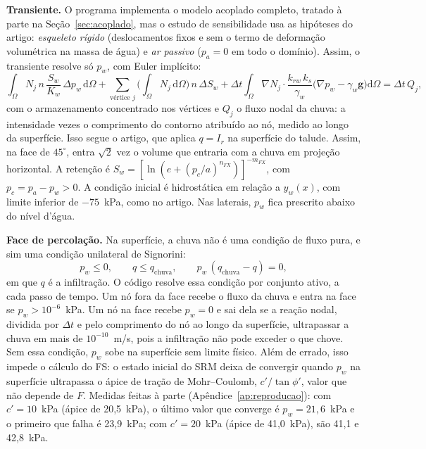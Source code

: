 \documentclass[11pt,a4paper]{article}
\numberwithin{equation}{section}
\begin{document}
\textbf{Transiente.} O programa implementa o modelo acoplado completo, tratado à parte na Seção~\ref{sec:acoplado}, mas o estudo de sensibilidade usa as hipóteses do artigo: \emph{esqueleto
rígido} (deslocamentos fixos e sem o termo de deformação volumétrica na massa de água) e \emph{ar passivo} ($p_a = 0$ em todo o
domínio). Assim, o transiente resolve só $p_w$, com Euler implícito:
\begin{equation}
\int_\Omega N_j\, n\,\frac{S_w}{K_w}\,\Delta p_w\,\mathrm{d}\Omega
+ \sum_{\text{vértice } j} \Big(\int_\Omega N_j\,\mathrm{d}\Omega\Big)\, n\,\Delta S_w
+ \Delta t\int_\Omega \nabla N_j\cdot \frac{k_{rw}\,k_s}{\gamma_w}\big(\nabla p_w - \gamma_w\mathbf{g}\big)\mathrm{d}\Omega = \Delta t\, Q_j,
\end{equation}
com o armazenamento concentrado nos vértices e $Q_j$ o fluxo nodal da chuva: a intensidade vezes o comprimento do contorno atribuído ao nó, medido ao longo da superfície. Isso segue o artigo, que aplica $q = I_r$ na superfície do talude. Assim, na face de $45^\circ$, entra $\sqrt{2}$ vez o volume que entraria com a chuva em projeção horizontal. A retenção é
$S_w = [\ln(e + (p_c/a)^{n_{FX}})]^{-m_{FX}}$, com $p_c = p_a - p_w > 0$. A condição inicial é hidrostática em relação a $y_w(x)$, com
limite inferior de $-75$~kPa, como no artigo. Nas laterais, $p_w$ fica prescrito abaixo do nível d'água.

\textbf{Face de percolação.} Na superfície, a chuva não é uma condição de fluxo pura, e sim uma condição unilateral de Signorini:
\begin{equation}
p_w \le 0, \qquad q \le q_{\mathrm{chuva}}, \qquad p_w\,(q_{\mathrm{chuva}} - q) = 0,
\end{equation}
em que $q$ é a infiltração. O código resolve essa condição por conjunto ativo, a cada passo de tempo. Um nó fora da face recebe o fluxo
da chuva e entra na face se $p_w > 10^{-6}$~kPa. Um nó na face recebe $p_w = 0$ e sai dela se a reação nodal, dividida por
$\Delta t$ e pelo comprimento do nó ao longo da superfície, ultrapassar a chuva em mais de $10^{-10}$~m/s, pois a infiltração não pode exceder o
que chove. Sem essa condição, $p_w$ sobe na superfície sem limite físico. Além de errado, isso impede o cálculo do FS: o estado
inicial do SRM deixa de convergir quando $p_w$ na superfície ultrapassa o ápice de tração de Mohr--Coulomb, $c'/\tan\phi'$, valor que não
depende de $F$. Medidas feitas à parte (Apêndice~\ref{ap:reproducao}): com $c' = 10$~kPa (ápice de 20,5~kPa), o último valor que converge é $p_w = 21{,}6$~kPa e o primeiro
que falha é 23,9~kPa; com $c' = 20$~kPa (ápice de 41,0~kPa), são 41,1 e 42,8~kPa.
\end{document}
